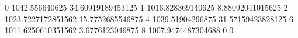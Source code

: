 0 1042.556640625 34.60919189453125
1 1016.828369140625 8.88092041015625
2 1023.7227172851562 15.7752685546875
4 1039.51904296875 31.57159423828125
6 1011.6250610351562 3.6776123046875
8 1007.9474487304688 0.0
